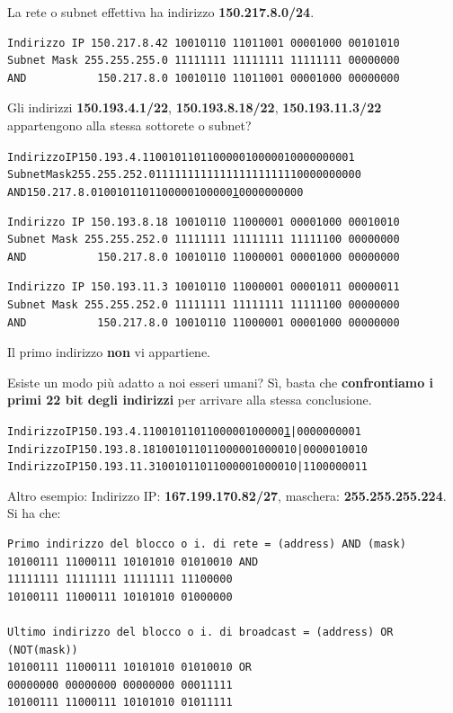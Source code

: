 \documentclass[11pt,a4paper,oneside]{book}
\theoremstyle{definition}
\begin{document}
La rete o subnet effettiva ha indirizzo \textbf{150.217.8.0/24}.
\begin{verbatim}
Indirizzo IP 150.217.8.42 10010110 11011001 00001000 00101010
Subnet Mask 255.255.255.0 11111111 11111111 11111111 00000000
AND           150.217.8.0 10010110 11011001 00001000 00000000
\end{verbatim}
Gli indirizzi \textbf{150.193.4.1/22}, \textbf{150.193.8.18/22}, \textbf{150.193.11.3/22} appartengono alla stessa sottorete o subnet?
\begin{alltt}
	Indirizzo IP 150.193.4.1  10010110 11000001 00000100 00000001
	Subnet Mask 255.255.252.0 11111111 11111111 11111100 00000000
	AND           150.217.8.0 10010110 11000001 00000\underline{1}00 00000000
\end{alltt}
\begin{verbatim}
Indirizzo IP 150.193.8.18 10010110 11000001 00001000 00010010
Subnet Mask 255.255.252.0 11111111 11111111 11111100 00000000
AND           150.217.8.0 10010110 11000001 00001000 00000000
\end{verbatim}
\begin{verbatim}
Indirizzo IP 150.193.11.3 10010110 11000001 00001011 00000011
Subnet Mask 255.255.252.0 11111111 11111111 11111100 00000000
AND           150.217.8.0 10010110 11000001 00001000 00000000
\end{verbatim}
Il primo indirizzo \textbf{non} vi appartiene.

Esiste un modo più adatto a noi esseri umani? Sì, basta che \textbf{confrontiamo i primi 22 bit degli indirizzi} per arrivare alla stessa conclusione.

\begin{alltt}
	Indirizzo IP 150.193.4.1  10010110 11000001 00000\underline{1} | 00 00000001
	Indirizzo IP 150.193.8.18 10010110 11000001 000010 | 00 00010010
	Indirizzo IP 150.193.11.3 10010110 11000001 000010 | 11 00000011
\end{alltt}

Altro esempio:\newline
Indirizzo IP: \textbf{167.199.170.82/27}, maschera: \textbf{255.255.255.224}. Si ha che:
\begin{verbatim}
Primo indirizzo del blocco o i. di rete = (address) AND (mask)
10100111 11000111 10101010 01010010 AND
11111111 11111111 11111111 11100000
10100111 11000111 10101010 01000000

Ultimo indirizzo del blocco o i. di broadcast = (address) OR (NOT(mask))
10100111 11000111 10101010 01010010 OR
00000000 00000000 00000000 00011111
10100111 11000111 10101010 01011111
\end{verbatim}
\end{document}
